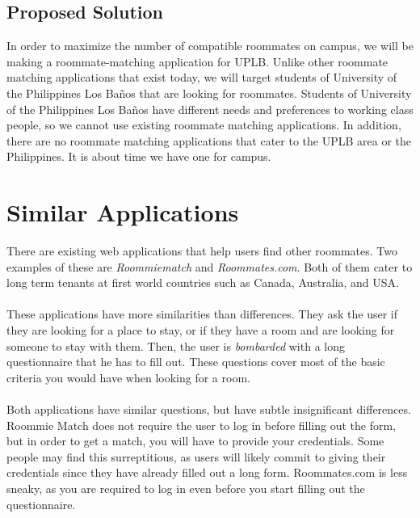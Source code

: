 \documentclass[11pt, draft, journal]{./IEEE/IEEEtran}
\newcommand{\UPLB}{University of the Philippines Los Ba\~{n}os }
\begin{document}
    \subsection{Proposed Solution}
    In order to maximize the number of compatible roommates on campus, we will be making a roommate-matching application for UPLB. Unlike other roommate matching applications that exist today, we will target students of \UPLB that are looking for roommates. Students of \UPLB  have different needs and preferences to working class people, so we cannot use existing roommate matching applications. In addition, there are no roommate matching applications that cater to the UPLB area or the Philippines. It is about time we have one for campus.
\newpage
\section{Similar Applications}
\pubidadjcol
There are existing web applications that help users find other roommates. Two examples of these are \textit{ Roommiematch} and \textit{Roommates.com}. Both of them cater to long term tenants at first world countries such as Canada, Australia, and USA.
\\
\\
These applications have more similarities than differences. They ask the user if they are looking for a place to stay, or if they have a room and are looking for someone to stay with them. Then, the user is \textit{bombarded} with a long questionnaire that he has to fill out. These questions cover most of the basic criteria you would have when looking for a room.
\\
\\
\indent Both applications have similar questions, but have subtle insignificant differences. Roommie Match does not require the user to log in before filling out the form, but in order to get a match, you will have to provide your credentials. Some people may find this surreptitious, as users will likely commit to giving their credentials since they have already filled out a long form. Roommates.com is less sneaky, as you are required to log in even before you start filling out the questionnaire.
\end{document}
